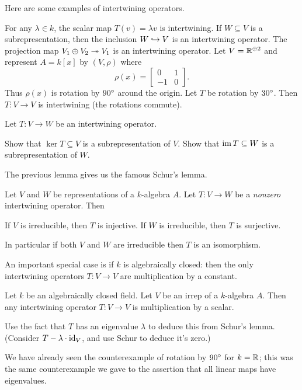Here are some examples of intertwining operators.
\begin{example}
	\listhack
	\begin{enumerate}[(a)]
		\ii For any $\lambda \in k$, the scalar map $T(v) = \lambda v$
		is intertwining.
		\ii If $W \subseteq V$ is a subrepresentation,
		then the inclusion $W \hookrightarrow V$ is an intertwining operator.
		\ii The projection map $V_1 \oplus V_2 \twoheadrightarrow V_1$
		is an intertwining operator.
		\ii Let $V  = \mathbb R^{\oplus 2}$
		and represent $A = k[x]$ by $(V, \rho)$ where
		\[ \rho(x) = \begin{bmatrix} 0 & 1 \\ -1 & 0 \end{bmatrix}. \]
		Thus $\rho(x)$ is rotation by $90^\circ$ around the origin.
		Let $T$ be rotation by $30^\circ$.
		Then $T \colon V \to V$ is intertwining (the rotations commute).
	\end{enumerate}
\end{example}

\begin{exercise}
	Let $T \colon V \to W$ be an intertwining operator.
	\begin{enumerate}[(a)]
		\ii Show that $\ker T \subseteq V$ is a subrepresentation of $V$.
		\ii Show that $\operatorname{im} T \subseteq W$ is a subrepresentation of $W$.
	\end{enumerate}
\end{exercise}

The previous lemma gives us the famous Schur's lemma.
\begin{theorem}
	Let $V$ and $W$ be representations of a $k$-algebra $A$.
	Let $T \colon V \to W$ be a \emph{nonzero} intertwining operator.
	Then
	\begin{enumerate}[(a)]
		\ii If $V$ is irreducible, then $T$ is injective.
		\ii If $W$ is irreducible, then $T$ is surjective.
	\end{enumerate}
	In particular if both $V$ and $W$ are irreducible then $T$
	is an isomorphism.
\end{theorem}
An important special case is if $k$ is algebraically closed:
then the only intertwining operators $T \colon V \to V$
are multiplication by a constant.
\begin{theorem}
	Let $k$ be an algebraically closed field.
	Let $V$ be an irrep of a $k$-algebra $A$.
	Then any intertwining operator $T \colon V \to V$ is multiplication by a scalar.
	\label{thm:schur_algclosed}
\end{theorem}
\begin{exercise}
	Use the fact that $T$ has an eigenvalue $\lambda$ to
	deduce this from Schur's lemma.
	(Consider $T - \lambda \cdot \mathrm{id}_V$, and use Schur to deduce it's zero.)
\end{exercise}
We have already seen the counterexample of rotation by $90^\circ$ for $k = \mathbb R$;
this was the same counterexample we gave to the assertion that all linear maps
have eigenvalues.

